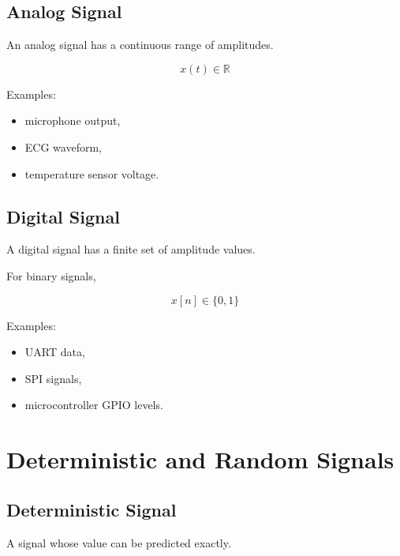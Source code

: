 
\subsection{Analog Signal}

An analog signal has a continuous range of amplitudes.

\[
x(t)\in\mathbb{R}
\]

Examples:

\begin{itemize}
\item microphone output,
\item ECG waveform,
\item temperature sensor voltage.
\end{itemize}


\subsection{Digital Signal}

A digital signal has a finite set of amplitude values.

For binary signals,

\[
x[n]\in\{0,1\}
\]

Examples:

\begin{itemize}
\item UART data,
\item SPI signals,
\item microcontroller GPIO levels.
\end{itemize}


\section{Deterministic and Random Signals}


\subsection{Deterministic Signal}

A signal whose value can be predicted exactly.

